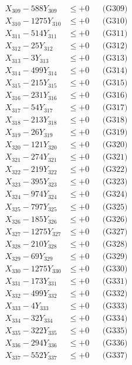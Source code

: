 \documentclass[a4paper,10pt]{article}
\begin{document}
{\begin{align}
X_{309} - 588Y_{309} &\leq +0 && \text{(G309)} \\
X_{310} - 1275Y_{310} &\leq +0 && \text{(G310)} \\
\allowbreak
X_{311} - 514Y_{311} &\leq +0 && \text{(G311)} \\
X_{312} - 25Y_{312} &\leq +0 && \text{(G312)} \\
X_{313} - 3Y_{313} &\leq +0 && \text{(G313)} \\
X_{314} - 499Y_{314} &\leq +0 && \text{(G314)} \\
X_{315} - 215Y_{315} &\leq +0 && \text{(G315)} \\
X_{316} - 231Y_{316} &\leq +0 && \text{(G316)} \\
X_{317} - 54Y_{317} &\leq +0 && \text{(G317)} \\
X_{318} - 213Y_{318} &\leq +0 && \text{(G318)} \\
X_{319} - 26Y_{319} &\leq +0 && \text{(G319)} \\
X_{320} - 121Y_{320} &\leq +0 && \text{(G320)} \\
\allowbreak
X_{321} - 274Y_{321} &\leq +0 && \text{(G321)} \\
X_{322} - 219Y_{322} &\leq +0 && \text{(G322)} \\
X_{323} - 395Y_{323} &\leq +0 && \text{(G323)} \\
X_{324} - 974Y_{324} &\leq +0 && \text{(G324)} \\
X_{325} - 797Y_{325} &\leq +0 && \text{(G325)} \\
X_{326} - 185Y_{326} &\leq +0 && \text{(G326)} \\
X_{327} - 1275Y_{327} &\leq +0 && \text{(G327)} \\
X_{328} - 210Y_{328} &\leq +0 && \text{(G328)} \\
X_{329} - 69Y_{329} &\leq +0 && \text{(G329)} \\
X_{330} - 1275Y_{330} &\leq +0 && \text{(G330)} \\
\allowbreak
X_{331} - 173Y_{331} &\leq +0 && \text{(G331)} \\
X_{332} - 499Y_{332} &\leq +0 && \text{(G332)} \\
X_{333} - 4Y_{333} &\leq +0 && \text{(G333)} \\
X_{334} - 32Y_{334} &\leq +0 && \text{(G334)} \\
X_{335} - 322Y_{335} &\leq +0 && \text{(G335)} \\
X_{336} - 294Y_{336} &\leq +0 && \text{(G336)} \\
X_{337} - 552Y_{337} &\leq +0 && \text{(G337)} \\

\end{align}}
\end{document}
